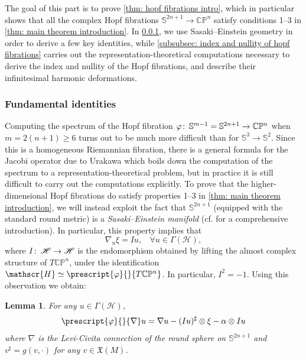 \documentclass{article}
\numberwithin{equation}{section}        %
\theoremstyle{bfnote}
\newtheorem{lem}[thm]{Lemma}                %
\theoremstyle{definition}
\theoremstyle{bfremark}
\newcommand{\col}{\colon \thinspace}        %
\newcommand{\C}{\mathbb{C}}                 %
\renewcommand{\P}{\mathbb{P}}               %
\newcommand{\Sp}{\mathbb{S}}                %
\begin{document}
The goal of this part is to prove \cref{thm: hopf fibrations intro}, which in particular shows that all the complex Hopf fibrations $\Sp^{2n+1} \to \mathbb{CP}^n$ satisfy conditions 1--3 in \cref{thm: main theorem introduction}. In \cref{subsubsec: fundamental identities}, we use Sasaki--Einstein geometry in order to derive a few key identities, while \cref{subsubsec: index and nullity of hopf fibrations} carries out the representation-theoretical computations necessary to derive the index and nullity of the Hopf fibrations, and describe their infinitesimal harmonic deformations.

    \subsubsection{Fundamental identities}      \label{subsubsec: fundamental identities}

Computing the spectrum of the Hopf fibration $\varphi \col \Sp^{m-1} = \Sp^{2n+1} \to \C\P^{n}$ when $m = 2(n+1) \geq 6$ turns out to be much more difficult than for $\Sp^3 \to \Sp^2$. Since this is a homogeneous Riemannian fibration, there is a general formula for the Jacobi operator due to Urakawa \cite{urakawa1987stability} which boils down the computation of the spectrum to a representation-theoretical problem, but in practice it is still difficult to carry out the computations explicitly. To prove that the higher-dimensional Hopf fibrations do satisfy properties 1--3 in \cref{thm: main theorem introduction}, we will instead exploit the fact that $\Sp^{2n+1}$ (equipped with the standard round metric) is a \emph{Sasaki--Einstein manifold} (cf. \cite{sparks2011sasaki} for a comprehensive introduction). In particular, this property implies that
\begin{equation}        \label{eq: nablaisasaki}
    \nabla_u \xi = I u, ~~~~ \forall u \in \Gamma(\mathscr H),
\end{equation}
where $I \col \mathscr H \to \mathscr H$ is the endomorphism obtained by lifting the almost complex structure of $T\C\P^{n}$, under the identification $\mathscr{H} \simeq \prescript{\varphi}{}{T\C\P^{n}}$. In particular, $I^2 = -1$. Using this observation we obtain:

\begin{lem}     \label{lem: connection for higher Hopf fibrations}
    For any $u \in \Gamma(\mathscr{H})$,
    \begin{equation*}
        \prescript{\varphi}{}{\nabla} u = \nabla u - (Iu)^\sharp \otimes \xi - \alpha \otimes Iu
    \end{equation*}
    where $\nabla$ is the Levi-Civita connection of the round sphere on $\Sp^{2n+1}$ and $v^\sharp = g(v,\cdot)$ for any $v \in \mathfrak{X}(M)$.
\end{lem}
\end{document}

